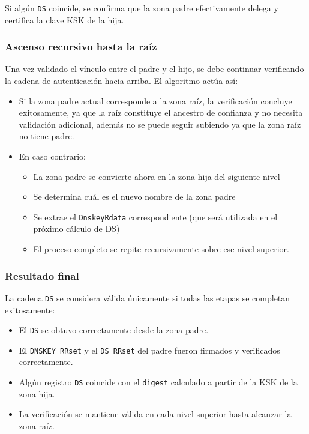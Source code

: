 Si algún \texttt{DS} coincide, se confirma que la zona padre efectivamente delega y certifica la clave KSK de la hija.

\subsubsection{Ascenso recursivo hasta la raíz}

Una vez validado el vínculo entre el padre y el hijo, se debe continuar verificando la cadena de autenticación hacia arriba. El algoritmo actúa así:

\begin{itemize}
    \item Si la zona padre actual corresponde a la zona raíz, la verificación concluye exitosamente, ya que la raíz constituye el ancestro de confianza y no necesita validación adicional, además
          no se puede seguir subiendo ya que la zona raíz no tiene padre.
    \item En caso contrario: 
    \begin{itemize}
        \item La zona padre se convierte ahora en la zona hija del siguiente nivel
        \item Se determina cuál es el nuevo nombre de la zona padre
        \item Se extrae el \texttt{DnskeyRdata} correspondiente (que será utilizada en el próximo cálculo de DS)
        \item El proceso completo se repite recursivamente sobre ese nivel superior.
    \end{itemize}
\end{itemize}

\subsubsection{Resultado final}

La cadena \texttt{DS} se considera válida únicamente si todas las etapas se completan exitosamente:

\begin{itemize}
    \item El \texttt{DS} se obtuvo correctamente desde la zona padre.
    \item El \texttt{DNSKEY RRset} y el \texttt{DS RRset} del padre fueron firmados y verificados correctamente.
    \item Algún registro \texttt{DS} coincide con el \texttt{digest} calculado a partir de la KSK de la zona hija.
    \item La verificación se mantiene válida en cada nivel superior hasta alcanzar la zona raíz.
\end{itemize}

